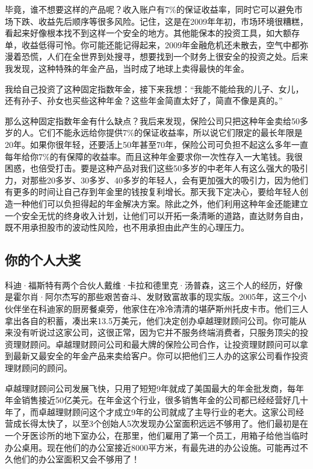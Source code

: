 毕竟，谁不想要这样的产品呢？收入账户有7\%的保证收益率，同时它可以避免市场下跌、收益先后顺序等很多风险。记住，这是在2009年年初，市场环境很糟糕，看起来好像根本找不到这样一个安全的地方。其他能保本的投资工具，如大额存单，收益低得可怜。你可能还能记得起来，2009年金融危机还未散去，空气中都弥漫着恐慌，人们在全世界到处搜寻，想要找到一个财务上很安全的投资之处。后来我发现，这种特殊的年金产品，当时成了地球上卖得最快的年金。

我给自己投资了这种固定指数年金，接下来我想：“我能不能给我的儿子、女儿，还有孙子、孙女也买些这种年金？这些年金简直太好了，简直不像是真的。”

那么这种固定指数年金有什么缺点？我后来发现，保险公司只把这种年金卖给50多岁的人。它们不能永远给你提供7\%的保证收益率，所以说它们限定的最长年限是20年。如果你很年轻，还要活上50年甚至70年，保险公司可负担不起这么多年一直每年给你7\%的有保障的收益率。而且这种年金要求你一次性存入一大笔钱。我很困惑，也倍受打击。要是这种产品对我们这些50多岁的中老年人有这么强大的吸引力，对那些20多岁、30多岁、40多岁的年轻人，会有更加强大的吸引力，因为他们有更多的时间让自己存到年金里的钱按复利增长。那天我下定决心，要给年轻人创造一种他们可以负担得起的年金解决方案。除此之外，他们利用这种年金还能建立一个安全无忧的终身收入计划，让他们可以开拓一条清晰的道路，直达财务自由，既不用承担股市的波动性风险，也不用承担由此产生的心理压力。

\subsection{你的个人大奖}

科迪·福斯特有两个合伙人戴维·卡拉和德里克·汤普森，这三个人的经历，好像是霍尔肖·阿尔杰写的那些艰苦奋斗、发财致富故事的现实版。2005年，这三个小伙伴坐在科迪家的厨房餐桌旁，他家住在冷冷清清的堪萨斯州托皮卡市。他们三人拿出各自的积蓄，凑出来13.5万美元，他们决定创办卓越理财顾问公司。你可能从来没有听说过这家公司，这很正常，因为它并不服务终端消费者，只服务顶尖的投资理财顾问。卓越理财顾问公司和最大牌的保险公司合作，让投资理财顾问可以拿到最新又最安全的年金产品来卖给客户。你可以把他们三人办的这家公司看作投资理财顾问的顾问。

卓越理财顾问公司发展飞快，只用了短短9年就成了美国最大的年金批发商，每年年金销售接近50亿美元。在年金这个行业，很多销售年金的公司都已经经营好几十年了，而卓越理财顾问这个才成立9年的公司就成了主导行业的老大。这家公司经营成长得太快了，以至3个创始人5次发现办公室面积远远不够用了。他们最初是在一个牙医诊所的地下室办公，在那里，他们雇用了第一个员工，用箱子给他当临时办公桌用。现在他们的办公室接近8000平方米，有最先进的办公设施。可能再过不久他们的办公室面积又会不够用了！

